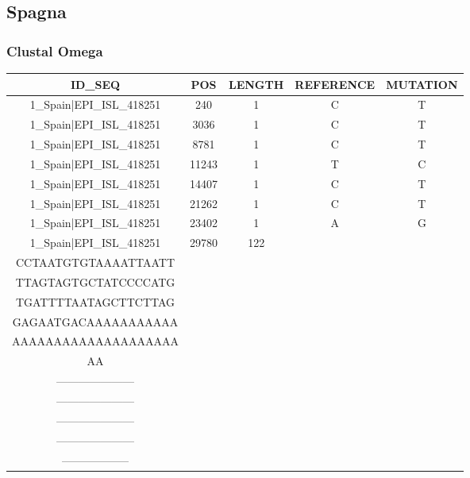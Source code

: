 \documentclass[a4paper,10pt]{article}
\begin{document}
\newpage

\subsection{Spagna}
\subsubsection{Clustal Omega}

\begin{longtable}{@{}ccccc@{}}
\toprule
\textbf{ID\_SEQ} & \textbf{POS} & \textbf{LENGTH} & \textbf{REFERENCE} & \textbf{MUTATION} \\* \midrule
\endfirsthead
%
\cline{1-5}
\endhead
%
1\_Spain|EPI\_ISL\_418251 & 240 & 1 & C & T \\* \midrule
1\_Spain|EPI\_ISL\_418251 & 3036 & 1 & C & T \\* \midrule
1\_Spain|EPI\_ISL\_418251 & 8781 & 1 & C & T \\* \midrule
1\_Spain|EPI\_ISL\_418251 & 11243 & 1 & T & C \\* \midrule
1\_Spain|EPI\_ISL\_418251 & 14407 & 1 & C & T \\* \midrule
1\_Spain|EPI\_ISL\_418251 & 21262 & 1 & C & T \\* \midrule
1\_Spain|EPI\_ISL\_418251 & 23402 & 1 & A & G \\* \midrule
1\_Spain|EPI\_ISL\_418251 & 29780 & 122 & \begin{tabular}[c]{@{}c@{}}AGCTGCCTATATGGAAGAGC\\ CCTAATGTGTAAAATTAATT\\ TTAGTAGTGCTATCCCCATG\\ TGATTTTAATAGCTTCTTAG\\ GAGAATGACAAAAAAAAAAA\\ AAAAAAAAAAAAAAAAAAAA\\ AA\end{tabular} & \begin{tabular}[c]{@{}c@{}}--------------------\\ ---------------------\\ ---------------------\\ ---------------------\\ ---------------------\\ ------------------\end{tabular} \\* \midrule

\end{longtable}
\end{document}
